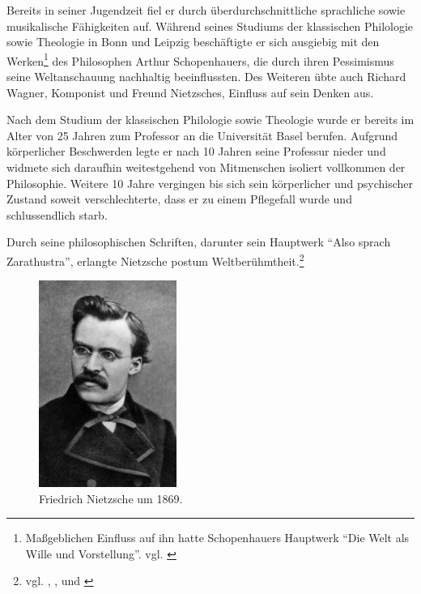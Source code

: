 Bereits in seiner Jugendzeit fiel er durch überdurchschnittliche sprachliche sowie musikalische Fähigkeiten auf.
Während seines Studiums der klassischen Philologie sowie Theologie in Bonn und Leipzig beschäftigte er sich ausgiebig mit den Werken\footnote{Maßgeblichen Einfluss auf ihn hatte Schopenhauers Hauptwerk \enquote{Die Welt als Wille und Vorstellung}. vgl. \cite{Schopenhauer1}}
des Philosophen Arthur Schopenhauers, die durch ihren Pessimismus seine Weltanschauung nachhaltig beeinflussten.
Des Weiteren übte auch Richard Wagner, Komponist und Freund Nietzsches, Einfluss auf sein Denken aus.

Nach dem Studium der klassischen Philologie sowie Theologie wurde er bereits im Alter von 25 Jahren zum Professor an die Universität Basel berufen.
Aufgrund körperlicher Beschwerden legte er nach 10 Jahren seine Professur nieder und widmete sich daraufhin weitestgehend von Mitmenschen isoliert vollkommen der Philosophie.
Weitere 10 Jahre vergingen bis sich sein körperlicher und psychischer Zustand soweit verschlechterte, dass er zu einem Pflegefall wurde und schlussendlich starb.

Durch seine philosophischen Schriften, darunter sein Hauptwerk \enquote{Also sprach Zarathustra}, erlangte Nietzsche postum Weltberühmtheit.\footnote{vgl. \cite{Nietzsche1}, \cite{Nietzsche2}, \cite{Nietzsche3} und \cite{Nietzsche4}}

\begin{figure}[H]
\centering 
 \includegraphics[width=0.4\textwidth]{Bilder/kap3/nietzschePortrait} 
 \caption{Friedrich Nietzsche um 1869.\cite{WQ14}  \label{portraitNietzsche}}
\end{figure}




